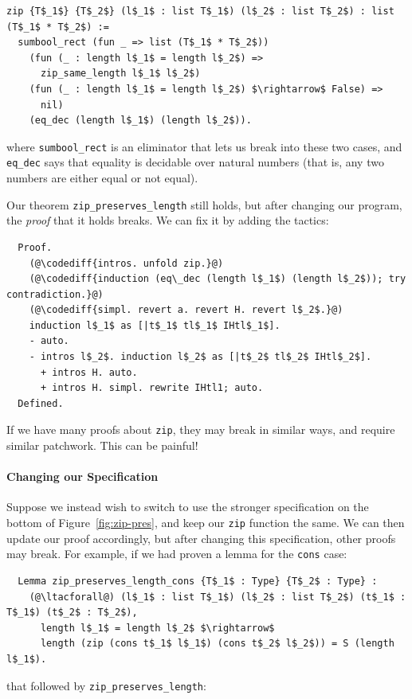 \begin{lstlisting}
zip {T$_1$} {T$_2$} (l$_1$ : list T$_1$) (l$_2$ : list T$_2$) : list (T$_1$ * T$_2$) :=
  sumbool_rect (fun _ => list (T$_1$ * T$_2$))
    (fun (_ : length l$_1$ = length l$_2$) =>
      zip_same_length l$_1$ l$_2$)
    (fun (_ : length l$_1$ = length l$_2$) $\rightarrow$ False) =>
      nil)
    (eq_dec (length l$_1$) (length l$_2$)).
\end{lstlisting}
where \lstinline{sumbool_rect} is an eliminator that lets us break into these two cases, and 
\lstinline{eq_dec} says that equality is decidable over natural numbers (that is, any two numbers are either equal or not equal).


Our theorem \lstinline{zip_preserves_length} still holds, but after changing our program, the \textit{proof} that it holds breaks.
We can fix it by adding the  tactics:

\begin{lstlisting}
  Proof.
    (@\codediff{intros. unfold zip.}@)
    (@\codediff{induction (eq\_dec (length l$_1$) (length l$_2$)); try contradiction.}@)
    (@\codediff{simpl. revert a. revert H. revert l$_2$.}@)
    induction l$_1$ as [|t$_1$ tl$_1$ IHtl$_1$].
    - auto.
    - intros l$_2$. induction l$_2$ as [|t$_2$ tl$_2$ IHtl$_2$].
      + intros H. auto.
      + intros H. simpl. rewrite IHtl1; auto.
  Defined.
\end{lstlisting}
If we have many proofs about \lstinline{zip}, they may break in similar ways, and require similar patchwork.
This can be painful!

\paragraph{Changing our Specification}
Suppose we instead wish to switch to use the stronger specification on the bottom of Figure~\ref{fig:zip-pres},
and keep our \lstinline{zip} function the same.
We can then update our proof accordingly, but after changing this specification, other proofs may break.
For example, if we had proven a lemma for the \lstinline{cons} case:

\begin{lstlisting}
  Lemma zip_preserves_length_cons {T$_1$ : Type} {T$_2$ : Type} :
    (@\ltacforall@) (l$_1$ : list T$_1$) (l$_2$ : list T$_2$) (t$_1$ : T$_1$) (t$_2$ : T$_2$),
      length l$_1$ = length l$_2$ $\rightarrow$
      length (zip (cons t$_1$ l$_1$) (cons t$_2$ l$_2$)) = S (length l$_1$).
\end{lstlisting}
that followed by \lstinline{zip_preserves_length}:

